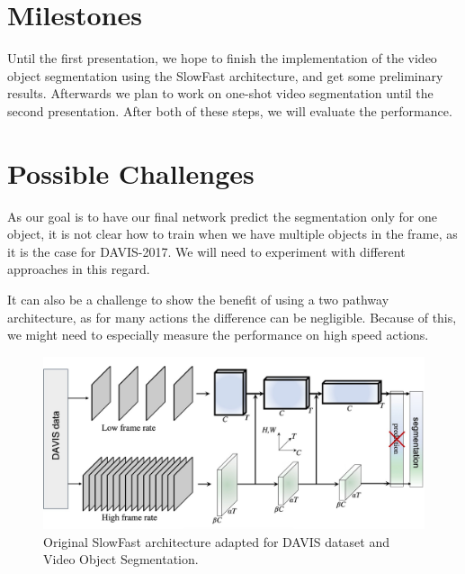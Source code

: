 \documentclass[conference]{IEEEtran}
\begin{document}
\section{Milestones}
Until the first presentation, we hope to finish the implementation of the video object segmentation using the SlowFast architecture, and get some preliminary results. Afterwards we plan to work on one-shot video segmentation until the second presentation. After both of these steps, we will evaluate the performance. 

\section{Possible Challenges}
As our goal is to have our final network predict the segmentation only for one object, it is not clear how to train when we have multiple objects in the frame, as it is the case for DAVIS-2017. We will need to experiment with different approaches in this regard. 

It can also be a challenge to show the benefit of using a two pathway architecture, as for many actions the difference can be negligible. Because of this, we might need to especially measure the performance on high speed actions.


\begin{figure}
	\centering
	\includegraphics[width=1.8\columnwidth]{SlowFastAdapted.jpg}
	\caption{Original SlowFast architecture adapted for DAVIS dataset and Video Object Segmentation.}
	\label{fig:slowfastadapted}
\end{figure}
\newpage



\end{document}
